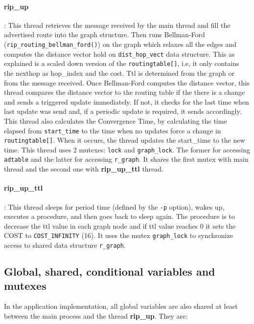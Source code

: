 \documentclass[10pt]{extarticle}
\begin{document}
\paragraph{rip\_up}:  This thread  retrieves the  message received  by the  main
thread  and fill  the  advertised  route into  the  graph  structure. Then  runs
Bellman-Ford (\texttt{rip\_routing\_bellman\_ford()}) on the graph which relaxes
all the edges and computes  the distance vector hold on \texttt{dist\_hop\_vect}
data  structure.   This  as  explained   is  a   scaled  down  version   of  the
\texttt{routingtable[]}, i.e, it only contains the nexthop as hop\_index and the
cost.   Ttl is  determined from  the graph  or from  the message  received. Once
Bellman-Ford computes  the distance  vector, this  thread compares  the distance
vector to  the routing  table if  the there is  a change  and sends  a triggered
update immediately.  If not, it  checks for the last  time when last  update was
send and,  if a periodic update  is required, it sends  accordingly. This thread
also  calculates the  Convergence Time,  by  calculating the  time elapsed  from
\texttt{start\_time}  to   the  time   when  no  updates   force  a   change  in
\texttt{routingtable[]}. When it  occurs, the thread updates  the start\_time to
the new time. This thread uses 2 mutexes: \texttt{lock} and \texttt{graph\_lock}.
The  former  for  accessing  \texttt{adtable}   and  the  latter  for  accessing
\texttt{r\_graph}. It shares the first mutex with main thread and the second one
with \textbf{rip\_up\_ttl} thread.

\paragraph{rip\_up\_ttl}: This thread sleeps for period time (defined by the
\texttt{-p} option), wakes up, executes a procedure, and then goes back to sleep
again. The procedure is to decrease the ttl value in each graph node and if ttl
value reaches 0 it sets the COST to \texttt{COST\_INFINITY} (16). 
It uses the mutex \texttt{graph\_lock} to synchronize access to shared data
structure \texttt{r\_graph}.

\subsection{Global, shared, conditional variables and mutexes}

In the application implementation, all global variables are also shared at least
between the main process and the thread \textbf{rip\_up}. They are:
\end{document}
